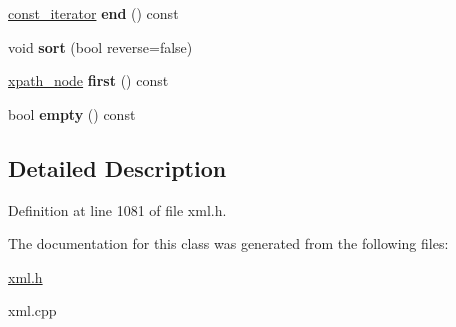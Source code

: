 \begin{DoxyCompactItemize}
\item 
\hypertarget{classphys_1_1xml_1_1xpath__node__set_ae22174a98bc75f9fc6af34d1ea4a00da}{
\hyperlink{classphys_1_1xml_1_1xpath__node}{const\_\-iterator} {\bfseries end} () const }
\label{d0/d0a/classphys_1_1xml_1_1xpath__node__set_ae22174a98bc75f9fc6af34d1ea4a00da}

\item 
\hypertarget{classphys_1_1xml_1_1xpath__node__set_ae22d5513bded2cd5b1643e8ac9eb1324}{
void {\bfseries sort} (bool reverse=false)}
\label{d0/d0a/classphys_1_1xml_1_1xpath__node__set_ae22d5513bded2cd5b1643e8ac9eb1324}

\item 
\hypertarget{classphys_1_1xml_1_1xpath__node__set_acb36e645b807dffb3f0a108ba0ea9c47}{
\hyperlink{classphys_1_1xml_1_1xpath__node}{xpath\_\-node} {\bfseries first} () const }
\label{d0/d0a/classphys_1_1xml_1_1xpath__node__set_acb36e645b807dffb3f0a108ba0ea9c47}

\item 
\hypertarget{classphys_1_1xml_1_1xpath__node__set_ae92c5f7b4876c866f1ea8185745e9112}{
bool {\bfseries empty} () const }
\label{d0/d0a/classphys_1_1xml_1_1xpath__node__set_ae92c5f7b4876c866f1ea8185745e9112}

\end{DoxyCompactItemize}


\subsection{Detailed Description}


Definition at line 1081 of file xml.h.



The documentation for this class was generated from the following files:\begin{DoxyCompactItemize}
\item 
\hyperlink{xml_8h}{xml.h}\item 
xml.cpp\end{DoxyCompactItemize}
